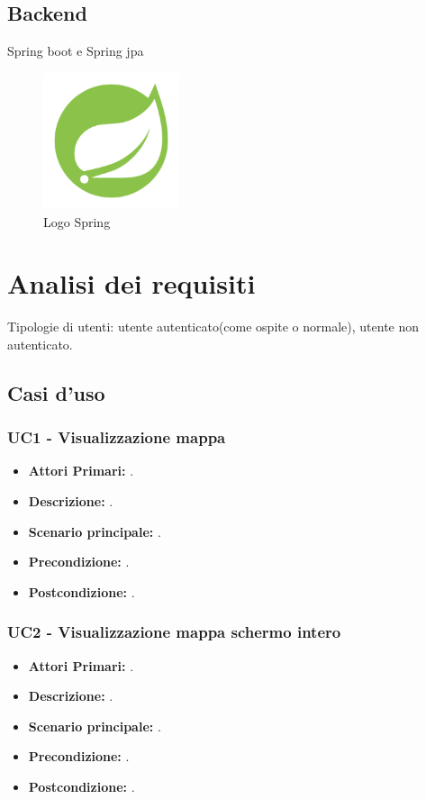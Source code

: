 \subsection{Backend}
Spring boot e Spring jpa

\begin{figure}[htbp]	
	\centering
	\includegraphics[width=4cm]{immagini/springlogo.png}
	\caption{Logo Spring}
	\label{fig:Logo Spring}
\end{figure}

\newpage

\section{Analisi dei requisiti}
Tipologie di utenti: utente autenticato(come ospite o normale), utente non autenticato.

\subsection{Casi d'uso}

\subsubsection{ UC1 - Visualizzazione mappa}
\begin{itemize}
	\item\textbf{Attori Primari:} .
	\item\textbf{Descrizione:} .
	\item\textbf{Scenario principale:} .
	\item\textbf{Precondizione:} .
	\item\textbf{Postcondizione:} .
\end{itemize}

\subsubsection{ UC2 - Visualizzazione mappa schermo intero}
\begin{itemize}
	\item\textbf{Attori Primari:} .
	\item\textbf{Descrizione:} .
	\item\textbf{Scenario principale:} .
	\item\textbf{Precondizione:} .
	\item\textbf{Postcondizione:} .
\end{itemize}

